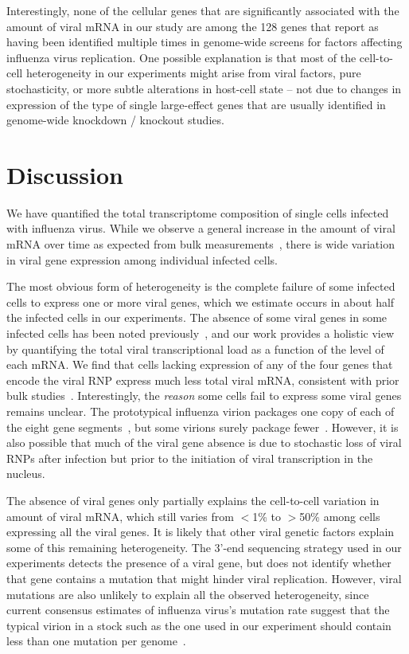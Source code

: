 \documentclass[9pt,lineno]{elife}
\begin{document}
Interestingly, none of the cellular genes that are significantly associated with the amount of viral mRNA in our study are among the 128 genes that \citet{watanabe2010cellular} report as having been identified multiple times in genome-wide screens for factors affecting influenza virus replication.
One possible explanation is that most of the cell-to-cell heterogeneity in our experiments might arise from viral factors, pure stochasticity, or more subtle alterations in host-cell state -- not due to changes in expression of the type of single large-effect genes that are usually identified in genome-wide knockdown / knockout studies.

\section{Discussion}
We have quantified the total transcriptome composition of single cells infected with influenza virus.
While we observe a general increase in the amount of viral mRNA over time as expected from bulk measurements~\citep{hatada1989control,Shapiro:1987ur}, there is wide variation in viral gene expression among individual infected cells.

The most obvious form of heterogeneity is the complete failure of some infected cells to express one or more viral genes, which we estimate occurs in about half the infected cells in our experiments.
The absence of some viral genes in some infected cells has been noted previously~\citep{Brooke:2013kb,Heldt:2015iz,Dou:2017cp}, and our work provides a holistic view by quantifying the total viral transcriptional load as a function of the level of each mRNA.
We find that cells lacking expression of any of the four genes that encode the viral RNP express much less total viral mRNA, consistent with prior bulk studies~\citep{Vreede:2004ip,eisfeld2015centre}.
Interestingly, the \emph{reason} some cells fail to express some viral genes remains unclear.
The prototypical influenza virion packages one copy of each of the eight gene segments~\citep{noda2006architecture,hutchinson2010genome}, but some virions surely package fewer~\citep{brooke2014influenza}.
However, it is also possible that much of the viral gene absence is due to stochastic loss of viral RNPs after infection but prior to the initiation of viral transcription in the nucleus.

The absence of viral genes only partially explains the cell-to-cell variation in amount of viral mRNA, which still varies from $<$1\% to $>$50\% among cells expressing all the viral genes.
It is likely that other viral genetic factors explain some of this remaining heterogeneity.
The 3'-end sequencing strategy used in our experiments detects the presence of a viral gene, but does not identify whether that gene contains a mutation that might hinder viral replication.
However, viral mutations are also unlikely to explain all the observed heterogeneity, since current consensus estimates of influenza virus's mutation rate suggest that the typical virion in a stock such as the one used in our experiment should contain less than one mutation per genome~\citep{parvin1986measurement,suarez1992heterogeneity,suarez1994estimation,nobusawa2006comparison,bloom2014experimentally,pauly2017novel}.
\end{document}
